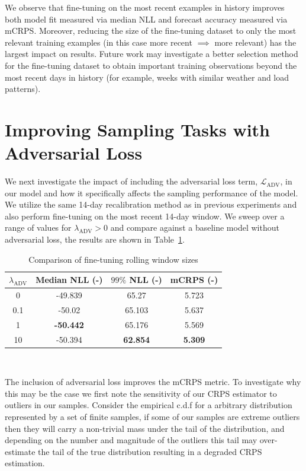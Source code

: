 We observe that fine-tuning on the most recent examples in history improves both model fit measured via
median NLL and forecast accuracy measured via mCRPS\@.
Moreover, reducing the size of the fine-tuning dataset to only the most relevant training examples (in this case more
recent $\implies$ more relevant) has the largest impact on results.
Future work may investigate a better selection method for the fine-tuning dataset to obtain important training
observations beyond the most recent days in history (for example, weeks with similar weather and load patterns).

\section{Improving Sampling Tasks with Adversarial Loss}\label{sec:improving-sampling-tasks}

We next investigate the impact of including the adversarial loss term, $\mathcal{L}_{\text{ADV}}$, in our model and
how it specifically affects the sampling performance of the model.
We utilize the same 14-day recalibration method as in previous experiments and also perform fine-tuning on the
most recent 14-day window.
We sweep over a range of values for $\lambda_{\text{ADV}} > 0$ and compare against a baseline model without adversarial
loss, the results are shown in Table~\ref{tab:ganloss}.

\begin{table}[htb]
    \caption[Results of including adversarial loss]{
        Comparison of fine-tuning rolling window sizes
    }
    \begin{center}
        \begin{tabular}{||c|c|c|c||} \hline
        $\lambda_{\text{ADV}}$ & Median NLL (-)  & $99\%$ NLL (-) & mCRPS (-)  \\	%
        \hline \hline
        0   &         -49.839  &         65.27   &         5.723 \\ \hline
        0.1 &         -50.02   &         65.103  &         5.637 \\ \hline
        1   & \textbf{-50.442} &         65.176  &         5.569 \\ \hline
        10  &         -50.394  & \textbf{62.854} & \textbf{5.309} \\ \hline
        \end{tabular}
        \\ \rule{0mm}{5mm}
    \end{center}
    \label{tab:ganloss}
\end{table}
The inclusion of adversarial loss improves the mCRPS metric.
To investigate why this may be the case we first note the sensitivity of our CRPS estimator to outliers in our samples.
Consider the empirical c.d.f for a arbitrary distribution represented by a set of finite samples, if some of our samples
are extreme outliers then they will carry a non-trivial mass under the tail of the distribution, and depending on the
number and magnitude of the outliers this tail may over-estimate the tail of the true distribution resulting in a
degraded CRPS estimation.

